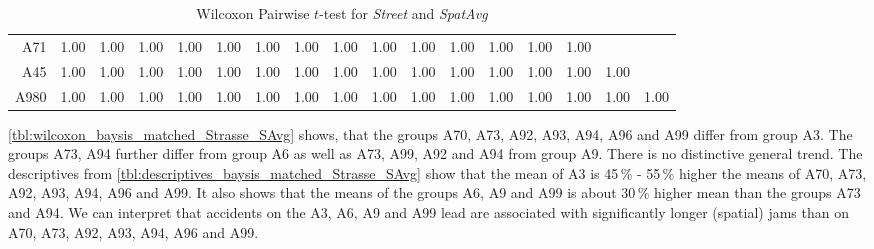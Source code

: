 \begin{table}[ht]
\begin{tabular}{rrrrrrrrrrrrrrrrr}
	  	A71 & 1.00 & 1.00 & 1.00 & 1.00 & 1.00 & 1.00 & 1.00 & 1.00 & 1.00 & 1.00 & 1.00 & 1.00 & 1.00 & 1.00 &  &  \\ 
	  	A45 & 1.00 & 1.00 & 1.00 & 1.00 & 1.00 & 1.00 & 1.00 & 1.00 & 1.00 & 1.00 & 1.00 & 1.00 & 1.00 & 1.00 & 1.00 &  \\ 
	  	A980 & 1.00 & 1.00 & 1.00 & 1.00 & 1.00 & 1.00 & 1.00 & 1.00 & 1.00 & 1.00 & 1.00 & 1.00 & 1.00 & 1.00 & 1.00 & 1.00 \\ 
		\bottomrule
	\end{tabular}
	\caption{Wilcoxon Pairwise $t$-test for \textit{Street} and \textit{SpatAvg}}
	\label{tbl:wilcoxon_baysis_matched_Strasse_SAvg}
\end{table}
\autoref{tbl:wilcoxon_baysis_matched_Strasse_SAvg} shows, that the groups A70, A73, A92, A93, A94, A96 and A99 differ from group A3. The groups A73, A94 further differ from group A6 as well as A73, A99, A92 and A94 from group A9. There is no distinctive general trend. The descriptives from \autoref{tbl:descriptives_baysis_matched_Strasse_SAvg} show that the mean of A3 is 45\,\% - 55\,\% higher the means of A70, A73, A92, A93, A94, A96 and A99. It also shows that the means of the groups A6, A9 and A99 is about 30\,\% higher mean than the groups A73 and A94. We can interpret that accidents on the A3, A6, A9 and A99 lead are associated with significantly longer (spatial) jams than on A70, A73, A92, A93, A94, A96 and A99.
